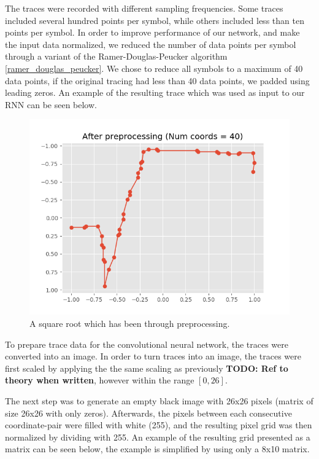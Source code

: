 The traces were recorded with different sampling frequencies. Some traces included several hundred points per symbol, while others included less than ten points per symbol. In order to improve performance of our network, and make the input data normalized, we reduced the number of data points per symbol through a variant of the Ramer-Douglas-Peucker algorithm \ref{ramer_douglas_peucker}. We chose to reduce all symbols to a maximum of 40 data points, if the original tracing had less than 40 data points, we padded using leading zeros. An example of the resulting trace which was used as input to our RNN can be seen below.

\begin{figure}[H]
    \centering
    \includegraphics[width=\linewidth,keepaspectratio]{Assets/Chapter3_Method/sqrt_after_preprocessing.png}
    \caption{A square root which has been through preprocessing.}
    \label{fig:sqrt_processed}
\end{figure}

To prepare trace data for the convolutional neural network, the traces were converted into an image. In order to turn traces into an image, the traces were first scaled by applying the the same scaling as previously \textbf{TODO: Ref to theory when written}, however within the range $[0, 26]$.

The next step was to generate an empty black image with 26x26 pixels (matrix of size 26x26 with only zeros). Afterwards, the pixels between each consecutive coordinate-pair were filled with white (255), and the resulting pixel grid was then normalized by dividing with 255. An example of the resulting grid presented as a matrix can be seen below, the example is simplified by using only a 8x10 matrix.

